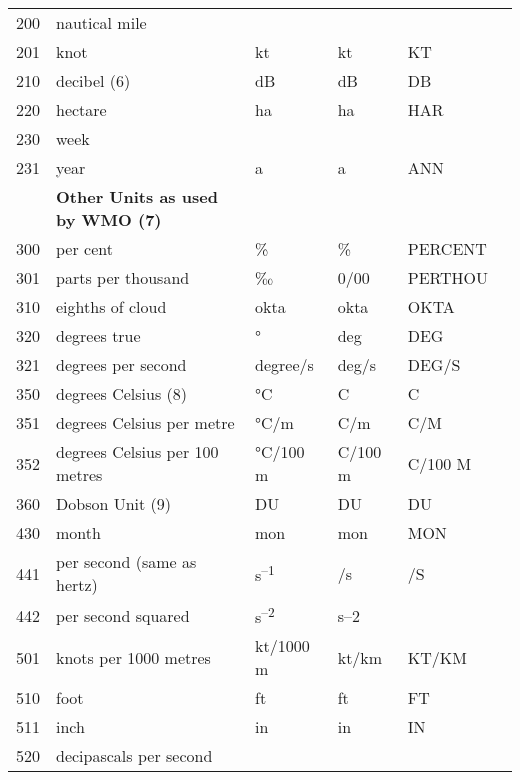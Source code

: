 \begin{longtable}[]{@{}llllll@{}}
200 & nautical mile & & & &\tabularnewline
201 & knot & kt & kt & KT &\tabularnewline
210 & decibel (6) & dB & dB & DB &\tabularnewline
220 & hectare & ha & ha & HAR &\tabularnewline
230 & week & & & &\tabularnewline
231 & year & a & a & ANN &\tabularnewline
& \textbf{Other Units as used by WMO (7)} & & & &\tabularnewline
300 & per cent & \% & \% & PERCENT &\tabularnewline
301 & parts per thousand & ‰ & 0/00 & PERTHOU &\tabularnewline
310 & eighths of cloud & okta & okta & OKTA &\tabularnewline
320 & degrees true & ° & deg & DEG &\tabularnewline
321 & degrees per second & degree/s & deg/s & DEG/S &\tabularnewline
350 & degrees Celsius (8) & °C & C & C &\tabularnewline
351 & degrees Celsius per metre & °C/m & C/m & C/M &\tabularnewline
352 & degrees Celsius per 100 metres & °C/100 m & C/100 m & C/100 M &\tabularnewline
360 & Dobson Unit (9) & DU & DU & DU &\tabularnewline
430 & month & mon & mon & MON &\tabularnewline
441 & per second (same as hertz) & s\textsuperscript{--1} & /s & /S &\tabularnewline
442 & per second squared & s\textsuperscript{--2} & s--2 & &\tabularnewline
501 & knots per 1000 metres & kt/1000 m & kt/km & KT/KM &\tabularnewline
510 & foot & ft & ft & FT &\tabularnewline
511 & inch & in & in & IN &\tabularnewline
\begin{minipage}[t]{0.14\columnwidth}\raggedright
520\strut
\end{minipage} & \begin{minipage}[t]{0.14\columnwidth}\raggedright
decipascals per second


\end{minipage}
\end{longtable}
